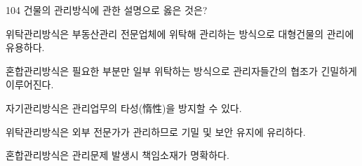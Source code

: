 \begin{question}{104}
건물의 관리방식에 관한 설명으로 옳은 것은?
\begin{choices}
  \item 위탁관리방식은 부동산관리 전문업체에 위탁해 관리하는 방식으로 대형건물의 관리에 유용하다.
  \item 혼합관리방식은 필요한 부분만 일부 위탁하는 방식으로 관리자들간의 협조가 긴밀하게 이루어진다.
  \item 자기관리방식은 관리업무의 타성(惰性)을 방지할 수 있다.
  \item 위탁관리방식은 외부 전문가가 관리하므로 기밀 및 보안 유지에 유리하다.
  \item 혼합관리방식은 관리문제 발생시 책임소재가 명확하다.
\end{choices}
\end{question}
